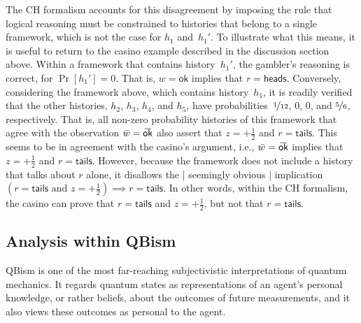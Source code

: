 \documentclass{article}
\theoremstyle{mystyle}
\theoremstyle{definition}
\newcommand{\oline}[2]{{\mkern#2mu\overline{\protect\vphantom{t}\mkern-#2mu\smash{#1}\mkern-#2mu}\mkern#2mu}}
\newcommand*{\ket}[1]{{| #1 \rangle}}
\newcommand{\proj}[1]{|#1\rangle\!\langle #1|}
\newcommand*{\wb}{\bar{w}}
\newcommand*{\splus}{{\textstyle + \frac{1}{2}}}
\newcommand*{\ok}{\mathsf{ok}}
\newcommand*{\okb}{\oline{\ok}{2.8}}
\newcommand*{\head}{\mathsf{heads}}
\newcommand*{\tail}{\mathsf{tails}}
\begin{document}

The CH formalism accounts for this disagreement by imposing the rule that logical reasoning must be constrained to histories that belong to a single framework, which is not the case for $h_1$ and~$h_1'$.  To illustrate what this means, it is useful to return to the  casino example described in  the discussion section above.  Within a framework that contains history~$h_1'$, the gambler's reasoning is correct, for $\Pr[h_1'] = 0$.  That is, $w= \ok$ implies that $r=\head$. Conversely, considering the framework above, which contains history~$h_1$, it is readily verified that the other histories, $h_2$, $h_3$, $h_4$, and $h_5$, have probabilities~$\nicefrac{1}{12}$, $0$, $0$, and $\nicefrac{5}{6}$, respectively. That is, all non-zero probability histories of this framework that agree with the observation $\wb=\okb$ also assert that $z = \splus$ and $r = \tail$. This seems to be in agreement with the casino's argument, i.e.,  $\wb = \okb$ implies that $z = \splus$ and $r = \tail$. However,  because the framework does not include a history that talks about $r$ alone, it disallows the | seemingly obvious | implication  $( r = \tail \text{ and } z = \splus ) \implies r = \tail$. In other words, within the CH formalism, the casino can prove that $r = \tail$ and $z = \splus$, but not that $r=\tail$. 

\subsection{Analysis within QBism} \label{app_QBism}

QBism is one of the most far-reaching subjectivistic interpretations of quantum mechanics.  It regards quantum states as representations of an agent's  personal knowledge, or rather beliefs, about the outcomes of future measurements, and it also views these outcomes as personal to the agent. 
\end{document}
